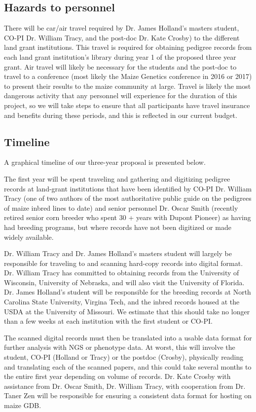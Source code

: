 \documentclass[draft,12pt]{article}
\begin{document}
\subsection*{Hazards to personnel}
There will be car/air travel required by Dr. James Holland's masters student, CO-PI Dr. William Tracy, and the post-doc Dr. Kate Crosby) to the different land grant institutions. 
This travel is required for obtaining pedigree records from each land grant institution's library during year 1 of the proposed three year grant. Air travel will likely be necessary for the students and the post-doc to travel to a conference (most likely the Maize Genetics conference in 2016 or 2017) to present their results to the maize community at large. 
Travel is likely the most dangerous activity that any personnel will experience for the duration of this project, so we will take steps to ensure that all participants have travel insurance and benefits during these periods, and
this is reflected in our current budget. 


\subsection*{Timeline}
A graphical timeline of our three-year proposal is presented below. %

The first year will be spent traveling and gathering and digitizing pedigree records at land-grant institutions that have been identified by CO-PI Dr. William Tracy (one of two authors of the most authoritative public guide on the pedigrees of maize inbred lines to date) and senior personnel Dr. Oscar Smith (recently retired senior corn breeder who spent 30 + years with Dupont Pioneer) as having had breeding programs, but where records have not been digitized or made widely available. 

Dr. William Tracy and Dr. James Holland's masters student will largely be responsible for traveling to and scanning hard-copy records into digital format. Dr. William Tracy has committed to obtaining records from the University of Wisconsin, University of Nebraska, and will also visit the University of Florida. 
Dr. James Holland's student will be responsible for the breeding records at North Carolina State University, Virgina Tech, and the inbred records housed at the USDA at the University of Missouri. We estimate that this should take no longer than a few weeks at each institution with the first student or CO-PI. 

The scanned digital records must then be translated into a usable data format for further analysis with NGS or phenotype data. At worst, this will involve the student, CO-PI (Holland or Tracy) or the postdoc (Crosby), physically reading and translating each of the scanned papers, and this could take several months to the entire first year depending on volume of records. 
Dr. Kate Crosby with assistance from Dr. Oscar Smith, Dr. William Tracy, with cooperation from Dr. Taner Zen will be responsible for ensuring a consistent data format for hosting on maize GDB.
\end{document}

